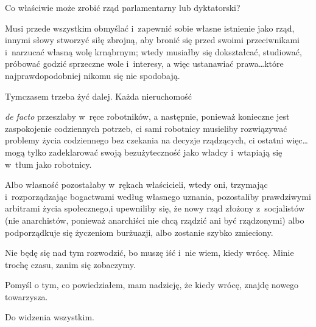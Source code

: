 \documentclass[oneside,polish,11pt,sfheadings]{mwbk}
\begin{document}
 
Co właściwie może zrobić rząd parlamentarny lub dyktatorski? 

 
Musi przede wszystkim obmyślać i~zapewnić sobie własne istnienie jako rząd, innymi słowy stworzyć siłę zbrojną, aby
bronić się przed swoimi przeciwnikami i~narzucać własną wolę krnąbrnym; wtedy musiałby się dokształcać, studiować,
próbować godzić sprzeczne wole i~interesy, a więc ustanawiać prawa\ldots które najprawdopodobniej nikomu się nie
spodobają. 

 
Tymczasem trzeba żyć dalej. Każda nieruchomość \begin{itshape} \end{itshape}\textit{de
facto} przeszłaby w~ręce robotników, a następnie, ponieważ konieczne jest zaspokojenie codziennych potrzeb, ci sami
robotnicy musieliby rozwiązywać problemy życia codziennego bez czekania na decyzje rządzących, ci ostatni więc\ldots mogą
tylko zadeklarować swoją bezużyteczność jako władcy i~wtapiają się w~tłum jako robotnicy. 

 
Albo własność pozostałaby w~rękach właścicieli, wtedy oni, trzymając i~rozporządzając bogactwami według własnego
uznania, pozostaliby prawdziwymi arbitrami życia społecznego,i upewniliby się, że nowy rząd złożony z~socjalistów (nie
anarchistów, ponieważ anarchiści nie chcą rządzić ani być rządzonymi) albo podporządkuje się życzeniom burżuazji, albo
zostanie szybko zmieciony. 

 
Nie będę się nad tym rozwodzić, bo muszę iść i~nie wiem, kiedy wrócę. Minie trochę czasu, zanim się zobaczymy. 

 
Pomyśl o tym, co powiedziałem, mam nadzieję, że kiedy wrócę, znajdę nowego towarzysza. 

 
Do widzenia wszystkim. 


\tableofcontents
\end{document}
